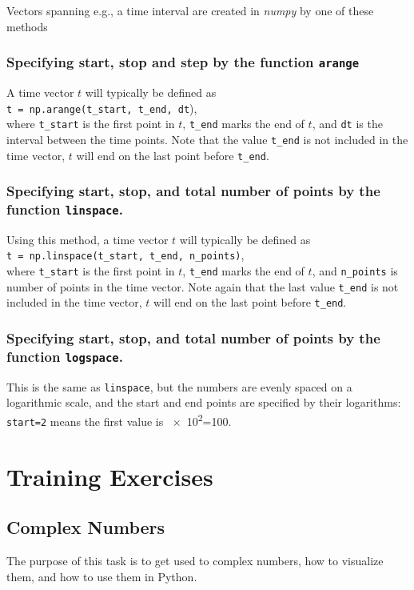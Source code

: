 Vectors spanning e.g., a time interval are created in \emph{numpy} by one of these methods

\subsubsection*{Specifying start, stop and step by the function \texttt{arange}} 
A time vector $t$ will typically be defined as\\
\verb|t = np.arange(t_start, t_end, dt|), \\
where \verb|t_start| is the first point in $t$, \verb|t_end| marks the end of $t$, and \verb|dt| is the interval between the time points. Note that the value \verb|t_end| is not included in the time vector, $t$ will end on the last point before \verb|t_end|.
	
\subsubsection*{Specifying start, stop, and total number of points by the function \texttt{linspace}. }
Using this method, a time vector $t$ will typically be defined as \\
\verb|t = np.linspace(t_start, t_end, n_points)|, \\
where \verb|t_start| is the first point in $t$, \verb|t_end| marks the end of $t$, and \verb|n_points| is number of points in the time vector. Note again that the last value \verb|t_end| is not included in the time vector, $t$ will end on the last point before \verb|t_end|.
	
\subsubsection*{Specifying start, stop, and total number of points by the function \texttt{logspace}.} 
	
This is the same as \verb|linspace|, but the numbers are evenly spaced on a logarithmic scale, and the start and end points are specified by their logarithms: \verb|start=2| means the first value is \num{e2}=\num{100}.


\section{Training Exercises}

\subsection{Complex Numbers}
The purpose of this task is to get used to complex numbers, how to visualize them, and how to use them in Python.

